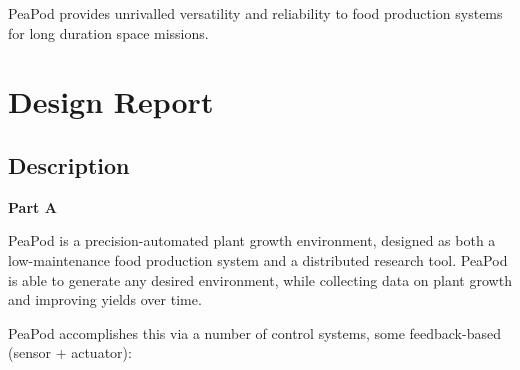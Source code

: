 \documentclass{report}
\begin{document}
PeaPod provides unrivalled versatility and reliability to food production systems for long duration space missions.

\section{Design Report}

\subsection{Description}
\label{sec:description}

\textbf{Part A}
\label{sec:description-a}




PeaPod is a precision-automated plant growth environment, designed as both a low-maintenance food production system and a distributed research tool. PeaPod is able to generate any desired environment, while collecting data on plant growth and improving yields over time.

PeaPod accomplishes this via a number of control systems, some feedback-based (sensor + actuator):
\end{document}
